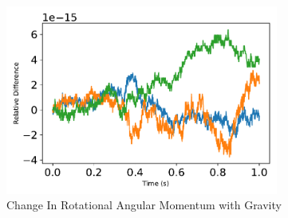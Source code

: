 \begin{figure}[htbp]\centerline{\includegraphics[width=0.8\textwidth]{AutoTeX/ChangeInRotationalAngularMomentum}}\caption{Change In Rotational Angular Momentum with Gravity}\label{fig:ChangeInRotationalAngularMomentum}\end{figure}